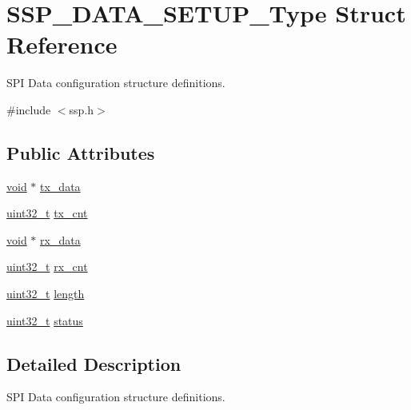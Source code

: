\hypertarget{struct_s_s_p___d_a_t_a___s_e_t_u_p___type}{}\section{S\+S\+P\+\_\+\+D\+A\+T\+A\+\_\+\+S\+E\+T\+U\+P\+\_\+\+Type Struct Reference}
\label{struct_s_s_p___d_a_t_a___s_e_t_u_p___type}


S\+PI Data configuration structure definitions.  




{\ttfamily \#include $<$ssp.\+h$>$}

\subsection*{Public Attributes}
\begin{DoxyCompactItemize}
\item 
\hyperlink{usb__devapi_8h_afabf60e7f57651d6d595a02c75f07cd0}{void} $\ast$ \hyperlink{struct_s_s_p___d_a_t_a___s_e_t_u_p___type_a3ce86564e96199f4bed5d67e13016a74}{tx\+\_\+data}
\item 
\hyperlink{_p_e___types_8h_a33594304e786b158f3fb30289278f5af}{uint32\+\_\+t} \hyperlink{struct_s_s_p___d_a_t_a___s_e_t_u_p___type_a857e70ea892f6e800fcfc7d971bb1daf}{tx\+\_\+cnt}
\item 
\hyperlink{usb__devapi_8h_afabf60e7f57651d6d595a02c75f07cd0}{void} $\ast$ \hyperlink{struct_s_s_p___d_a_t_a___s_e_t_u_p___type_a8ecbeda1d5013eb75f16e9260e1e99df}{rx\+\_\+data}
\item 
\hyperlink{_p_e___types_8h_a33594304e786b158f3fb30289278f5af}{uint32\+\_\+t} \hyperlink{struct_s_s_p___d_a_t_a___s_e_t_u_p___type_ad0a0475e1e9ebfd10d6ddacf40a34e20}{rx\+\_\+cnt}
\item 
\hyperlink{_p_e___types_8h_a33594304e786b158f3fb30289278f5af}{uint32\+\_\+t} \hyperlink{struct_s_s_p___d_a_t_a___s_e_t_u_p___type_a15861aad38292a3b5b5bc2137be7b471}{length}
\item 
\hyperlink{_p_e___types_8h_a33594304e786b158f3fb30289278f5af}{uint32\+\_\+t} \hyperlink{struct_s_s_p___d_a_t_a___s_e_t_u_p___type_abf9967b343e936a1e2cbdefbe9f53cea}{status}
\end{DoxyCompactItemize}


\subsection{Detailed Description}
S\+PI Data configuration structure definitions. 

